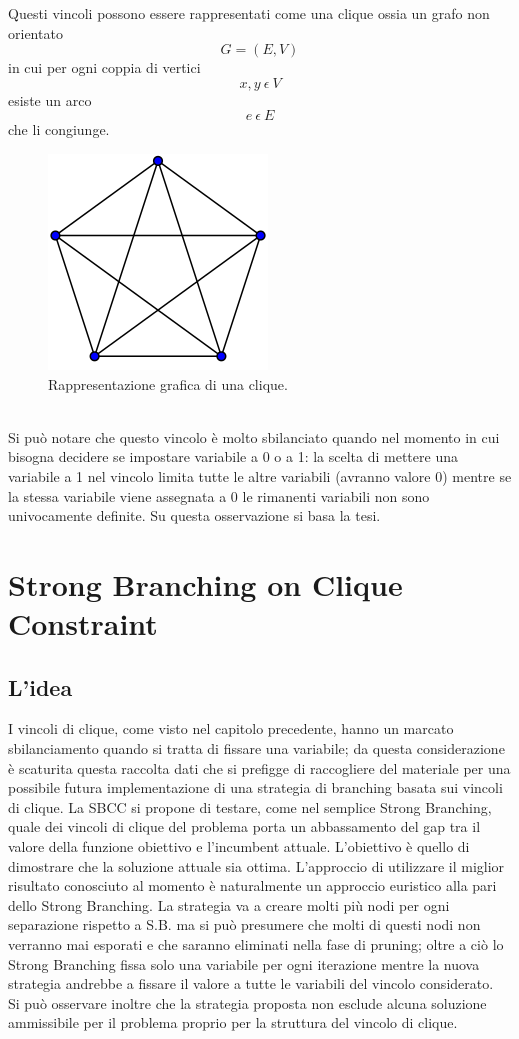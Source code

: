 \documentclass[12pt,a4paper,twoside,openright]{book}
\begin{document}
Questi vincoli possono essere rappresentati come una clique ossia un grafo 
non orientato \[G = (E, V)\] in cui per ogni coppia di vertici \[x,y\:\epsilon\:V\] esiste 
un arco \[e\:\epsilon\:E\] che li congiunge.
\begin{figure}[ht]
    \centering
    \includegraphics [scale = 0.5]{cricca.png}
    \caption{Rappresentazione grafica di una clique. }
    \label{fig:cricca}
\end{figure}\\
Si può notare che questo vincolo è molto sbilanciato quando nel momento in cui bisogna decidere se impostare
variabile a 0 o a 1: la scelta di mettere una variabile a 1 nel vincolo limita tutte le 
altre variabili (avranno valore 0) mentre se la stessa variabile viene assegnata a 0 le rimanenti variabili 
non sono univocamente definite. Su questa osservazione si basa la tesi.

\chapter{Strong Branching on Clique Constraint}
\section{L'idea}
I vincoli di clique, come visto nel capitolo precedente, hanno un marcato sbilanciamento quando si 
tratta di fissare una variabile; da questa considerazione è scaturita questa raccolta dati  
che si prefigge di raccogliere del materiale per una possibile futura implementazione di una 
strategia di branching basata sui vincoli di clique. La SBCC si propone di testare, come nel semplice Strong Branching,
quale dei vincoli di clique del problema porta un abbassamento del gap tra il valore della funzione obiettivo e
l'incumbent attuale. L'obiettivo è quello di dimostrare che la soluzione attuale sia ottima.
L'approccio di utilizzare il miglior risultato conosciuto al momento è naturalmente un approccio
euristico alla pari dello Strong Branching.
La strategia va a creare molti più nodi per ogni separazione rispetto a S.B. ma si può presumere che 
molti di questi nodi non verranno mai esporati e che saranno eliminati nella fase di pruning; oltre a ciò
lo Strong Branching fissa solo una variabile per ogni iterazione mentre la nuova strategia andrebbe a fissare 
il valore a tutte le variabili del vincolo considerato. \\
Si può osservare inoltre che la strategia proposta non esclude alcuna soluzione ammissibile per il
problema proprio per la struttura del vincolo di clique.
\end{document}

